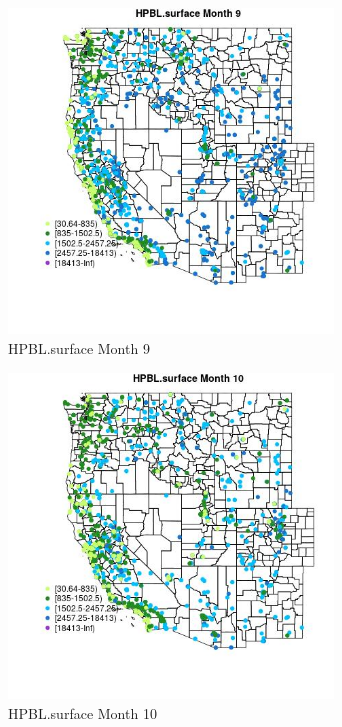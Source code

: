 \begin{figure} 
\centering  
\includegraphics[width=0.77\textwidth]{Code_Outputs/Report_ML_input_PM25_Step4_part_f_de_duplicated_aves_prioritize_24hr_obswNAs_MapObsMo9HPBLsurface.jpg} 
\caption{\label{fig:Report_ML_input_PM25_Step4_part_f_de_duplicated_aves_prioritize_24hr_obswNAsMapObsMo9HPBLsurface}HPBL.surface Month 9} 
\end{figure} 
 

\clearpage 

\begin{figure} 
\centering  
\includegraphics[width=0.77\textwidth]{Code_Outputs/Report_ML_input_PM25_Step4_part_f_de_duplicated_aves_prioritize_24hr_obswNAs_MapObsMo10HPBLsurface.jpg} 
\caption{\label{fig:Report_ML_input_PM25_Step4_part_f_de_duplicated_aves_prioritize_24hr_obswNAsMapObsMo10HPBLsurface}HPBL.surface Month 10} 
\end{figure} 
 


